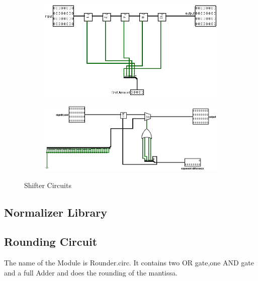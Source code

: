 \documentclass[a4paper,12pt]{article}
\begin{document}
\begin{figure}[H]
\begin{subfigure}[b]{0.3\textwidth}
    \end{subfigure}
    \hfill
    \begin{subfigure}[b]{0.3\textwidth}
        \centering
        \includegraphics[width=\linewidth]{Arbitary RightShifter.png}
    \end{subfigure}
    \newline
    \newline
    \hfill
    \begin{subfigure}[b]{0.3\textwidth}
        \centering
        \includegraphics[width=\linewidth]{Right_Shifter.png}
    \end{subfigure}
    \caption{Shifter Circuits}


\end{figure}

\pagebreak

\subsection{Normalizer Library}



\subsection{Rounding Circuit}
The name of the Module is Rounder.circ. It contains two OR gate,one AND gate and a full Adder and does the rounding of the mantissa.
\end{document}
